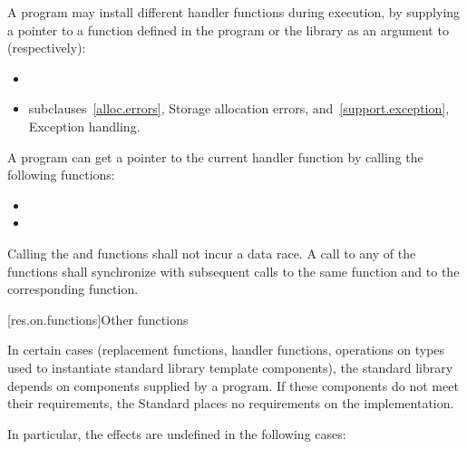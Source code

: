 \pnum
A \Cpp program may install different handler functions during execution, by
supplying a pointer to a function defined in the program or the library
as an argument to (respectively):

\begin{itemize}
\item
{}%
\item
{}

\xref
subclauses~\ref{alloc.errors}, Storage allocation errors, and~\ref{support.exception}, 
Exception handling.
\end{itemize}

\pnum
A \Cpp program can get a pointer to the current handler function by calling the following 
functions:

\begin{itemize}
\item
{}%
\item
{}
\end{itemize}

\pnum
Calling the  and  functions shall not incur a data race. A call to
any of the  functions shall synchronize with subsequent calls to the same
 function and to the corresponding  function.

[res.on.functions]{Other functions}

\pnum
In certain cases (replacement functions, handler functions, operations on types used to
instantiate standard library template components), the \Cpp standard library depends on
components supplied by a \Cpp program.
If these components do not meet their requirements, the Standard places no requirements
on the implementation.

\pnum
In particular, the effects are undefined in the following cases:

